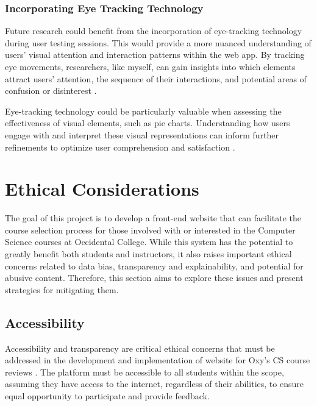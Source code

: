 \documentclass[10pt,twocolumn]{article}
\begin{document}
\subsubsection{Incorporating Eye Tracking Technology}

Future research could benefit from the incorporation of eye-tracking technology during user testing sessions. This would provide a more nuanced understanding of users' visual attention and interaction patterns within the web app. By tracking eye movements, researchers, like myself, can gain insights into which elements attract users' attention, the sequence of their interactions, and potential areas of confusion or disinterest \cite{benway99}.

Eye-tracking technology could be particularly valuable when assessing the effectiveness of visual elements, such as pie charts. Understanding how users engage with and interpret these visual representations can inform further refinements to optimize user comprehension and satisfaction \cite{benway99}.



\section{Ethical Considerations}
The goal of this project is to develop a front-end website that can facilitate the course selection process for those involved with or interested in the Computer Science courses at Occidental College. While this system has the potential to greatly benefit both students and instructors, it also raises important ethical concerns related to data bias, transparency and explainability, and potential for abusive content. Therefore, this section aims to explore these issues and present strategies for mitigating them.

\subsection{Accessibility}
Accessibility and transparency are critical ethical concerns that must be addressed in the development and implementation of website for Oxy's CS course reviews \cite{shin2022}. The platform must be accessible to all students within the scope, assuming they have access to the internet, regardless of their abilities, to ensure equal opportunity to participate and provide feedback.
\end{document}
